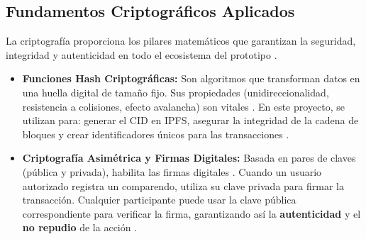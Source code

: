 \subsection{Fundamentos Criptográficos Aplicados}
La criptografía proporciona los pilares matemáticos que garantizan la seguridad, integridad y autenticidad en todo el ecosistema del prototipo \parencite{katz2020introduction}.
\begin{itemize}
    \item \textbf{Funciones Hash Criptográficas:} Son algoritmos que transforman datos en una huella digital de tamaño fijo. Sus propiedades (unidireccionalidad, resistencia a colisiones, efecto avalancha) son vitales \parencite{schneier2007applied, menezes1996handbook}. En este proyecto, se utilizan para: generar el CID en IPFS, asegurar la integridad de la cadena de bloques y crear identificadores únicos para las transacciones \parencite{benet2014ipfs, nakamoto2008bitcoin}.
    \item \textbf{Criptografía Asimétrica y Firmas Digitales:} Basada en pares de claves (pública y privada), habilita las firmas digitales \parencite{diffie2022new, rivest1978method}. Cuando un usuario autorizado registra un comparendo, utiliza su clave privada para firmar la transacción. Cualquier participante puede usar la clave pública correspondiente para verificar la firma, garantizando así la \textbf{autenticidad} y el \textbf{no repudio} de la acción \parencite{katz2020introduction}.
\end{itemize}